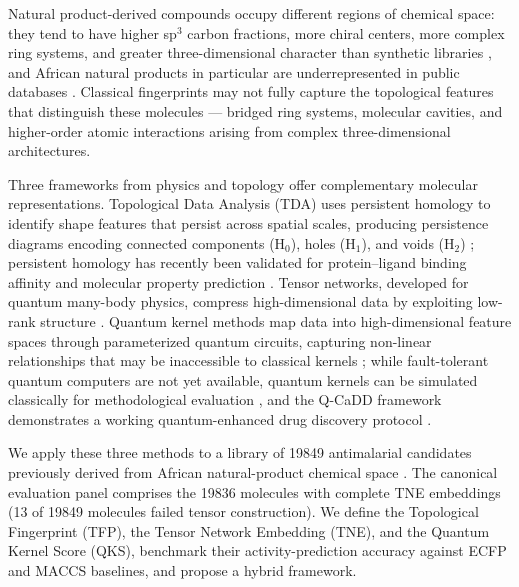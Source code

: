 \documentclass[11pt,a4paper]{article}
\begin{document}
Natural product-derived compounds occupy different regions of chemical space: they tend to have higher sp$^3$ carbon fractions, more chiral centers, more complex ring systems, and greater three-dimensional character than synthetic libraries \citep{coconut_2021}, and African natural products in particular are underrepresented in public databases \citep{anpdb_2026,value_addition_african_np_2025}. Classical fingerprints may not fully capture the topological features that distinguish these molecules --- bridged ring systems, molecular cavities, and higher-order atomic interactions arising from complex three-dimensional architectures.

Three frameworks from physics and topology offer complementary molecular representations. Topological Data Analysis (TDA) uses persistent homology to identify shape features that persist across spatial scales, producing persistence diagrams encoding connected components (H$_0$), holes (H$_1$), and voids (H$_2$) \citep{tda_review_2025}; persistent homology has recently been validated for protein--ligand binding affinity \citep{tda_binding_affinity_2026} and molecular property prediction \citep{tda_pretraining_2026}. Tensor networks, developed for quantum many-body physics, compress high-dimensional data by exploiting low-rank structure \citep{tensornet_2023,tn_efficient_2026}. Quantum kernel methods map data into high-dimensional feature spaces through parameterized quantum circuits, capturing non-linear relationships that may be inaccessible to classical kernels \citep{qml_review_2026}; while fault-tolerant quantum computers are not yet available, quantum kernels can be simulated classically for methodological evaluation \citep{pqc_chemistry_2026}, and the Q-CaDD framework demonstrates a working quantum-enhanced drug discovery protocol \citep{q_cadd_2026}.

We apply these three methods to a library of \num{19849} antimalarial candidates previously derived from African natural-product chemical space \citep{temgoua2026antimalarial}. The canonical evaluation panel comprises the \num{19836} molecules with complete TNE embeddings (13 of \num{19849} molecules failed tensor construction). We define the Topological Fingerprint (TFP), the Tensor Network Embedding (TNE), and the Quantum Kernel Score (QKS), benchmark their activity-prediction accuracy against ECFP and MACCS baselines, and propose a hybrid framework.
\end{document}
